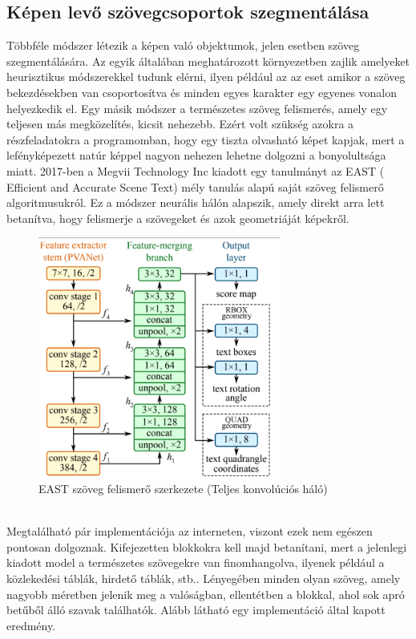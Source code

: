 \documentclass[a4paper,12pt]{article}
\begin{document}
\subsection{Képen levő szövegcsoportok szegmentálása}
Többféle módszer létezik a képen való objektumok, jelen esetben szöveg szegmentálására. Az egyik általában meghatározott környezetben zajlik amelyeket heurisztikus módszerekkel tudunk elérni, ilyen például az az eset amikor a szöveg bekezdésekben van csoportosítva és minden egyes karakter egy egyenes vonalon helyezkedik el. Egy másik módszer a természetes szöveg felismerés, amely egy teljesen más megközelítés, kicsit nehezebb. Ezért volt szükség  azokra a részfeladatokra a programomban, hogy egy tiszta olvasható képet kapjak, mert a lefényképezett natúr képpel nagyon nehezen lehetne dolgozni a bonyolultsága miatt. 2017-ben a Megvii Technology Inc kiadott egy tanulmányt az EAST ( Efficient and Accurate Scene Text) mély tanulás alapú saját szöveg felismerő algoritmusukról. Ez a módszer neurális hálón alapszik, amely direkt arra lett betanítva, hogy felismerje a szövegeket és azok geometriáját képekről. 
\begin{figure}[h]
	\centering
	\includegraphics[width=8cm]{east}
	\caption{EAST szöveg felismerő szerkezete (Teljes konvolúciós háló)}
\end{figure}
\\Megtalálható pár implementációja az interneten, viszont ezek nem egészen pontosan dolgoznak. Kifejezetten blokkokra kell majd betanítani, mert a jelenlegi kiadott model a természetes szövegekre van finomhangolva, ilyenek például a közlekedési táblák, hirdető táblák, stb.. Lényegében minden olyan szöveg, amely nagyobb méretben jelenik meg a valóságban, ellentétben a blokkal, ahol sok apró betűből álló szavak találhatók. Alább látható egy implementáció által kapott eredmény.
\end{document}
